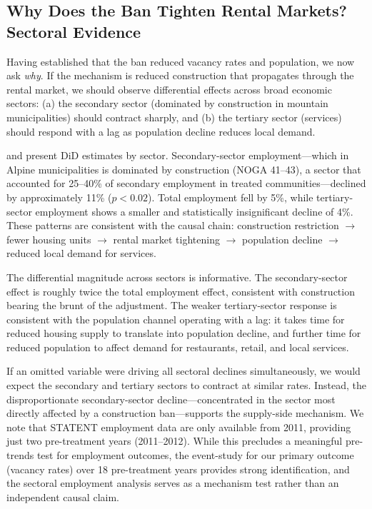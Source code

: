 \documentclass[12pt]{article}
\begin{document}
\subsection{Why Does the Ban Tighten Rental Markets? Sectoral Evidence}

Having established that the ban reduced vacancy rates and population, we now ask \textit{why}. If the mechanism is reduced construction that propagates through the rental market, we should observe differential effects across broad economic sectors: (a) the secondary sector (dominated by construction in mountain municipalities) should contract sharply, and (b) the tertiary sector (services) should respond with a lag as population decline reduces local demand.

 and  present DiD estimates by sector. Secondary-sector employment---which in Alpine municipalities is dominated by construction (NOGA 41--43), a sector that accounted for 25--40\% of secondary employment in treated communities---declined by approximately 11\% ($p < 0.02$). Total employment fell by 5\%, while tertiary-sector employment shows a smaller and statistically insignificant decline of 4\%. These patterns are consistent with the causal chain: construction restriction $\rightarrow$ fewer housing units $\rightarrow$ rental market tightening $\rightarrow$ population decline $\rightarrow$ reduced local demand for services.

The differential magnitude across sectors is informative. The secondary-sector effect is roughly twice the total employment effect, consistent with construction bearing the brunt of the adjustment. The weaker tertiary-sector response is consistent with the population channel operating with a lag: it takes time for reduced housing supply to translate into population decline, and further time for reduced population to affect demand for restaurants, retail, and local services.

If an omitted variable were driving all sectoral declines simultaneously, we would expect the secondary and tertiary sectors to contract at similar rates. Instead, the disproportionate secondary-sector decline---concentrated in the sector most directly affected by a construction ban---supports the supply-side mechanism. We note that STATENT employment data are only available from 2011, providing just two pre-treatment years (2011--2012). While this precludes a meaningful pre-trends test for employment outcomes, the event-study for our primary outcome (vacancy rates) over 18 pre-treatment years provides strong identification, and the sectoral employment analysis serves as a mechanism test rather than an independent causal claim.
\end{document}
